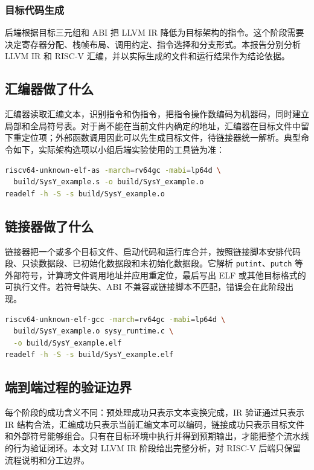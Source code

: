 \documentclass[a4paper]{article}
\begin{document}
\subsubsection{目标代码生成}

后端根据目标三元组和 ABI 把 LLVM IR 降低为目标架构的指令。这个阶段需要决定寄存器分配、栈帧布局、调用约定、指令选择和分支形式。本报告分别分析 LLVM IR 和 RISC-V 汇编，并以实际生成的文件和运行结果作为结论依据。

\subsection{汇编器做了什么}

汇编器读取汇编文本，识别指令和伪指令，把指令操作数编码为机器码，同时建立局部和全局符号表。对于尚不能在当前文件内确定的地址，汇编器在目标文件中留下重定位项；外部函数调用因此可以先生成目标文件，待链接器统一解析。典型命令如下，实际架构选项以小组后端实验使用的工具链为准：

\begin{lstlisting}[language=bash,caption={汇编器阶段命令}]
riscv64-unknown-elf-as -march=rv64gc -mabi=lp64d \
  build/SysY_example.s -o build/SysY_example.o
readelf -h -S -s build/SysY_example.o
\end{lstlisting}

\subsection{链接器做了什么}

链接器把一个或多个目标文件、启动代码和运行库合并，按照链接脚本安排代码段、只读数据段、已初始化数据段和未初始化数据段。它解析 \texttt{putint}、\texttt{putch} 等外部符号，计算跨文件调用地址并应用重定位，最后写出 ELF 或其他目标格式的可执行文件。若符号缺失、ABI 不兼容或链接脚本不匹配，错误会在此阶段出现。

\begin{lstlisting}[language=bash,caption={链接器阶段命令}]
riscv64-unknown-elf-gcc -march=rv64gc -mabi=lp64d \
  build/SysY_example.o sysy_runtime.c \
  -o build/SysY_example.elf
readelf -h -S -s build/SysY_example.elf
\end{lstlisting}

\subsection{端到端过程的验证边界}

每个阶段的成功含义不同：预处理成功只表示文本变换完成，IR 验证通过只表示 IR 结构合法，汇编成功只表示当前汇编文本可以编码，链接成功只表示目标文件和外部符号能够组合。只有在目标环境中执行并得到预期输出，才能把整个流水线的行为验证闭环。本文对 LLVM IR 阶段给出完整分析，对 RISC-V 后端只保留流程说明和分工边界。
\end{document}
